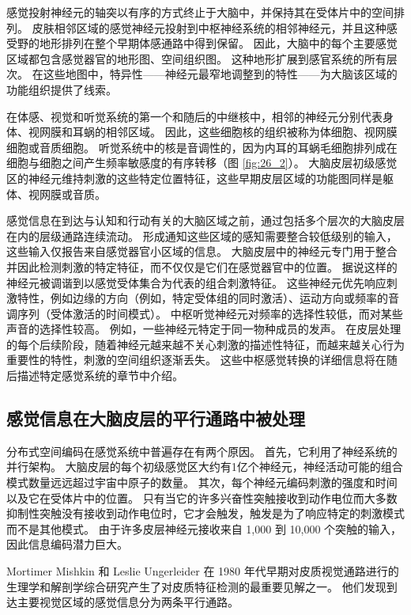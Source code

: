 感觉投射神经元的轴突以有序的方式终止于大脑中，并保持其在受体片中的空间排列。 
皮肤相邻区域的感觉神经元投射到中枢神经系统的相邻神经元，并且这种感受野的地形排列在整个早期体感通路中得到保留。 
因此，大脑中的每个主要感觉区域都包含感觉器官的地形图、空间组织图。 
这种地形扩展到感官系统的所有层次。 
在这些地图中，特异性——神经元最窄地调整到的特性——为大脑该区域的功能组织提供了线索。


在体感、视觉和听觉系统的第一个和随后的中继核中，相邻的神经元分别代表身体、视网膜和耳蜗的相邻区域。 
因此，这些细胞核的组织被称为体细胞、视网膜细胞或音质细胞。 
听觉系统中的核是音调性的，因为内耳的耳蜗毛细胞排列成在细胞与细胞之间产生频率敏感度的有序转移（图 \ref{fig:26_2}）。 
大脑皮层初级感觉区的神经元维持刺激的这些特定位置特征，这些早期皮层区域的功能图同样是躯体、视网膜或音质。


感觉信息在到达与认知和行动有关的大脑区域之前，通过包括多个层次的大脑皮层在内的层级通路连续流动。 
形成通知这些区域的感知需要整合较低级别的输入，这些输入仅报告来自感觉器官小区域的信息。 
大脑皮层中的神经元专门用于整合并因此检测刺激的特定特征，而不仅仅是它们在感觉器官中的位置。 
据说这样的神经元被调谐到以感觉受体集合为代表的组合刺激特征。 
这些神经元优先响应刺激特性，例如边缘的方向（例如，特定受体组的同时激活）、运动方向或频率的音调序列（受体激活的时间模式）。 
中枢听觉神经元对频率的选择性较低，而对某些声音的选择性较高。 
例如，一些神经元特定于同一物种成员的发声。 
在皮层处理的每个后续阶段，随着神经元越来越不关心刺激的描述性特征，而越来越关心行为重要性的特性，刺激的空间组织逐渐丢失。 
这些中枢感觉转换的详细信息将在随后描述特定感觉系统的章节中介绍。


\subsection{感觉信息在大脑皮层的平行通路中被处理}

分布式空间编码在感觉系统中普遍存在有两个原因。 
首先，它利用了神经系统的并行架构。 
大脑皮层的每个初级感觉区大约有1亿个神经元，神经活动可能的组合模式数量远远超过宇宙中原子的数量。 
其次，每个神经元编码刺激的强度和时间以及它在受体片中的位置。 
只有当它的许多兴奋性突触接收到动作电位而大多数抑制性突触没有接收到动作电位时，它才会触发，触发是为了响应特定的刺激模式而不是其他模式。 
由于许多皮层神经元接收来自 1,000 到 10,000 个突触的输入，因此信息编码潜力巨大。


Mortimer Mishkin 和 Leslie Ungerleider 在 1980 年代早期对皮质视觉通路进行的生理学和解剖学综合研究产生了对皮质特征检测的最重要见解之一。 
他们发现到达主要视觉区域的感觉信息分为两条平行通路。


